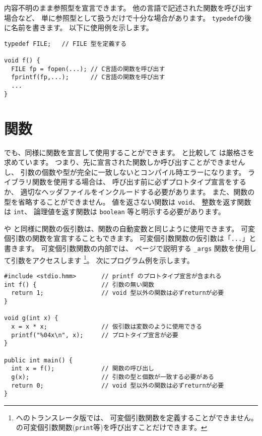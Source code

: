 内容不明のまま参照型を宣言できます。
他の言語で記述された関数を呼び出す場合など、
単に参照型として扱うだけで十分な場合があります。
\verb/typedef/の後に名前を書きます。
以下に使用例を示します。

\begin{mylist}
\begin{verbatim}
typedef FILE;   // FILE 型を定義する

void f() {
  FILE fp = fopen(...); // C言語の関数を呼び出す
  fprintf(fp,...);      // C言語の関数を呼び出す
  ...
}
\end{verbatim}
\end{mylist}

\section{関数}
\label{chap3:func}
\cmml でも、\cl 同様に関数を宣言して使用することができます。
\cl と比較して \cmml は厳格さを求めています。
つまり、先に宣言された関数しか呼び出すことができませんし、
引数の個数や型が完全に一致しないとコンパイル時エラーになります。
ライブラリ関数を使用する場合は、
呼び出す前に必ずプロトタイプ宣言をするか、
適切なヘッダファイルをインクルードする必要があります。
また、関数の型を省略することができません。
値を返さない関数は \verb/void/、
整数を返す関数は \verb/int/、
論理値を返す関数は \verb/boolean/ 等と明示する必要があります。

\cl や \javal と同様に関数の仮引数は、関数の自動変数と同じように使用できます。
可変個引数の関数を宣言することもできます。
可変個引数関数の仮引数は「\verb/.../」と書きます。
可変個引数関数の内部では、
\pageref{chap4:args}ページで説明する
\verb/_args/ 関数を使用して引数をアクセスします
\footnote{\cl へのトランスレータ版では、
可変個引数関数を定義することができません。
\cl の可変個引数関数(\verb/print/等)を呼び出すことだけできます。}。
次にプログラム例を示します。

\begin{mylist}
\begin{verbatim}
#include <stdio.hmm>       // printf のプロトタイプ宣言が含まれる
int f() {                  // 引数の無い関数
  return 1;                // void 型以外の関数は必ずreturnが必要
}

void g(int x) {
  x = x * x;               // 仮引数は変数のように使用できる
  printf("%04x\n", x);     // プロトタイプ宣言が必要
}

public int main() {
  int x = f();             // 関数の呼び出し
  g(x);                    // 引数の型と個数が一致する必要がある
  return 0;                // void 型以外の関数は必ずreturnが必要
}
\end{verbatim}
\end{mylist}

